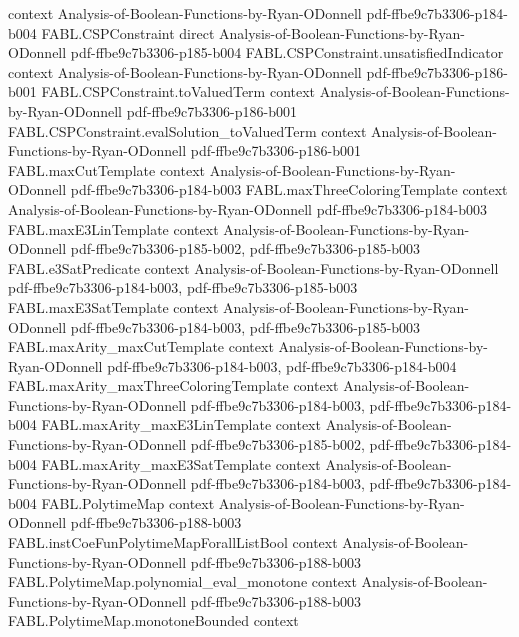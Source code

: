 \begin{theorem}
  {context}
  {Analysis-of-Boolean-Functions-by-Ryan-ODonnell}
  {pdf-ffbe9c7b3306-p184-b004}
\proofstep
  {FABL.CSPConstraint}
  {direct}
  {Analysis-of-Boolean-Functions-by-Ryan-ODonnell}
  {pdf-ffbe9c7b3306-p185-b004}
\proofstep
  {FABL.CSPConstraint.unsatisfiedIndicator}
  {context}
  {Analysis-of-Boolean-Functions-by-Ryan-ODonnell}
  {pdf-ffbe9c7b3306-p186-b001}
\proofstep
  {FABL.CSPConstraint.toValuedTerm}
  {context}
  {Analysis-of-Boolean-Functions-by-Ryan-ODonnell}
  {pdf-ffbe9c7b3306-p186-b001}
\proofstep
  {FABL.CSPConstraint.evalSolution_toValuedTerm}
  {context}
  {Analysis-of-Boolean-Functions-by-Ryan-ODonnell}
  {pdf-ffbe9c7b3306-p186-b001}
\proofstep
  {FABL.maxCutTemplate}
  {context}
  {Analysis-of-Boolean-Functions-by-Ryan-ODonnell}
  {pdf-ffbe9c7b3306-p184-b003}
\proofstep
  {FABL.maxThreeColoringTemplate}
  {context}
  {Analysis-of-Boolean-Functions-by-Ryan-ODonnell}
  {pdf-ffbe9c7b3306-p184-b003}
\proofstep
  {FABL.maxE3LinTemplate}
  {context}
  {Analysis-of-Boolean-Functions-by-Ryan-ODonnell}
  {pdf-ffbe9c7b3306-p185-b002,
    pdf-ffbe9c7b3306-p185-b003}
\proofstep
  {FABL.e3SatPredicate}
  {context}
  {Analysis-of-Boolean-Functions-by-Ryan-ODonnell}
  {pdf-ffbe9c7b3306-p184-b003,
    pdf-ffbe9c7b3306-p185-b003}
\proofstep
  {FABL.maxE3SatTemplate}
  {context}
  {Analysis-of-Boolean-Functions-by-Ryan-ODonnell}
  {pdf-ffbe9c7b3306-p184-b003,
    pdf-ffbe9c7b3306-p185-b003}
\proofstep
  {FABL.maxArity_maxCutTemplate}
  {context}
  {Analysis-of-Boolean-Functions-by-Ryan-ODonnell}
  {pdf-ffbe9c7b3306-p184-b003,
    pdf-ffbe9c7b3306-p184-b004}
\proofstep
  {FABL.maxArity_maxThreeColoringTemplate}
  {context}
  {Analysis-of-Boolean-Functions-by-Ryan-ODonnell}
  {pdf-ffbe9c7b3306-p184-b003,
    pdf-ffbe9c7b3306-p184-b004}
\proofstep
  {FABL.maxArity_maxE3LinTemplate}
  {context}
  {Analysis-of-Boolean-Functions-by-Ryan-ODonnell}
  {pdf-ffbe9c7b3306-p185-b002,
    pdf-ffbe9c7b3306-p184-b004}
\proofstep
  {FABL.maxArity_maxE3SatTemplate}
  {context}
  {Analysis-of-Boolean-Functions-by-Ryan-ODonnell}
  {pdf-ffbe9c7b3306-p184-b003,
    pdf-ffbe9c7b3306-p184-b004}
\proofstep
  {FABL.PolytimeMap}
  {context}
  {Analysis-of-Boolean-Functions-by-Ryan-ODonnell}
  {pdf-ffbe9c7b3306-p188-b003}
\proofstep
  {FABL.instCoeFunPolytimeMapForallListBool}
  {context}
  {Analysis-of-Boolean-Functions-by-Ryan-ODonnell}
  {pdf-ffbe9c7b3306-p188-b003}
\proofstep
  {FABL.PolytimeMap.polynomial_eval_monotone}
  {context}
  {Analysis-of-Boolean-Functions-by-Ryan-ODonnell}
  {pdf-ffbe9c7b3306-p188-b003}
\proofstep
  {FABL.PolytimeMap.monotoneBounded}
  {context}

\end{theorem}
